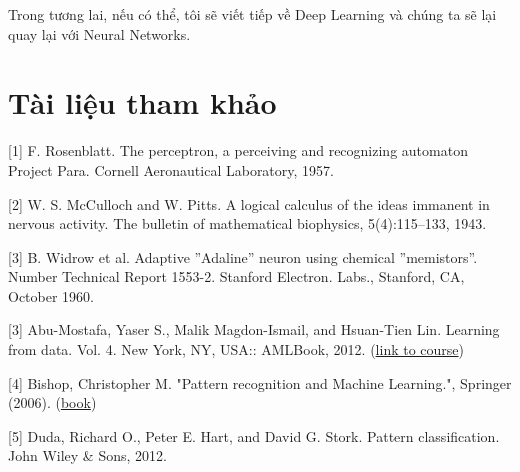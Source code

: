 Trong tương lai, nếu có thể, tôi sẽ viết tiếp về Deep Learning và chúng ta sẽ lại quay lại với Neural Networks. 
 
 
\section{Tài liệu tham khảo}
 
[1] F. Rosenblatt. The perceptron, a perceiving and recognizing automaton Project Para. Cornell Aeronautical Laboratory, 1957. 
 
[2] W. S. McCulloch and W. Pitts. A logical calculus of the ideas immanent in nervous activity. The bulletin of mathematical biophysics, 5(4):115–133, 1943. 
 
[3] B. Widrow et al. Adaptive ”Adaline” neuron using chemical ”memistors”. Number Technical Report 1553-2. Stanford Electron. Labs., Stanford, CA, October 1960. 
 
[3] Abu-Mostafa, Yaser S., Malik Magdon-Ismail, and Hsuan-Tien Lin. Learning from data. Vol. 4. New York, NY, USA:: AMLBook, 2012. (\href{http://work.caltech.edu/telecourse.html}{link to course}) 
 
[4] Bishop, Christopher M. "Pattern recognition and Machine Learning.", Springer  (2006). (\href{http://users.isr.ist.utl.pt/~wurmd/Livros/school/Bishop%20-%20Pattern%20Recognition%20And%20Machine%20Learning%20-%20Springer%20%202006.pdf}{book}) 
 
[5] Duda, Richard O., Peter E. Hart, and David G. Stork. Pattern classification. John Wiley \& Sons, 2012. 
 
